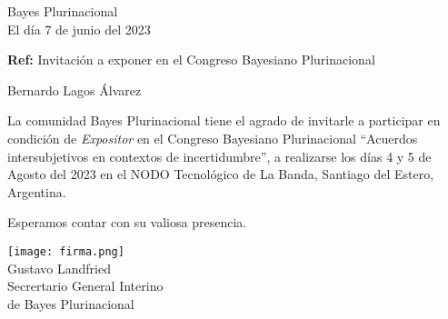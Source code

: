 \documentclass[a4paper,11pt]{letter}
\begin{document}
\begin{letter}{\phantom{.}}


\begin{flushright}
Bayes Plurinacional \\
El día 7 de junio del 2023
\end{flushright}

\vspace{1cm}
\noindent

\hfill \textbf{Ref:} Invitación a exponer en el Congreso Bayesiano Plurinacional\\

\vspace{1cm}

\hspace{0.3cm} Bernardo Lagos Álvarez


\hspace{1cm} La comunidad Bayes Plurinacional tiene el agrado de invitarle a participar en condición de \emph{Expositor} en el Congreso Bayesiano Plurinacional ``Acuerdos intersubjetivos en contextos de incertidumbre'', a realizarse los días 4 y 5 de Agosto del 2023 en el NODO Tecnológico de La Banda, Santiago del Estero, Argentina.

\vspace{0.3cm}

\hspace{1cm} Esperamos contar con su valiosa presencia.


\begin{flushleft}
\hfill \texttt{[image: firma.png]}\hspace{2cm}\phantom{.} \\[0cm]
\hfill Gustavo Landfried \hspace{2.5cm}\phantom{.}\\ \small
\hfill Secrertario General Interino \hspace{2.5cm}\phantom{.}\\
\hfill de Bayes Plurinacional \hspace{2.5cm}\phantom{.}\\
\end{flushleft}


%
%
%


 \end{letter}
\end{document}
